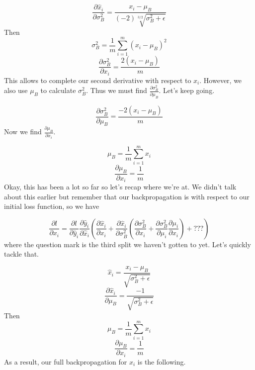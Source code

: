 \documentclass[12pt]{article}
\begin{document}
\begin{equation*}
    \frac{\partial \hat{x}_i}{\partial \sigma_B^2} = 
    \frac{x_i - \mu_B}{(-2) \sqrt[3/2]{\sigma_B^2 + \epsilon}}
\end{equation*}
Then 
\begin{equation*}
    \sigma_B^2 = \frac{1}{m} \sum_{i=1}^m (x_i - \mu_B)^2
\end{equation*}
\begin{equation*}
    \frac{\partial \sigma_B^2}{\partial x_i} = 
    \frac{2(x_i - \mu_B)}{m}
\end{equation*}
This allows to complete our second derivative with respect to $x_i$. However, we also use 
$\mu_B$ to calculate $\sigma_B^2$. Thus we must find 
$\frac{\partial \sigma_B^2}{\partial \mu_B}$. Let's keep going. 

\begin{equation*}
    \frac{\partial \sigma_B^2}{\partial \mu_B} = 
    \frac{-2(x_i - \mu_B)}{m}
\end{equation*}
Now we find $\frac{\partial \mu_B}{\partial x_i}$. 

\begin{equation*}
    \mu_B = \frac{1}{m} \sum_{i=1}^m x_i
\end{equation*}
\begin{equation*}
    \frac{\partial \mu_B}{\partial x_i} = 
    \frac{1}{m}
\end{equation*}
Okay, this has been a lot so far so let's recap where we're at. We didn't talk 
about this earlier but remember that our backpropagation is with respect to 
our initial loss function, so we have

\begin{equation*}
    \frac{\partial l}{\partial x_i} = 
    \frac{\partial l}{\partial \hat{y}_i} 
    \frac{\partial \hat{y}_i} {\partial \hat{x}_i} 
    (
        \frac{\partial \hat{x}_i}{\partial x_i} + 
        \frac{\partial \hat{x}_i}{\partial \sigma_B^2} 
        (
            \frac{\partial \sigma_B^2}{\partial x_i} + 
            \frac{\partial \sigma_B^2}{\partial \mu_i} 
            \frac{\partial \mu_i}{\partial x_i} 
        ) + 
        ???
    )
\end{equation*}
where the question mark is the third split we haven't gotten to yet. Let's quickly tackle that. 

\begin{equation*}
    \hat{x}_i = \frac{x_i - \mu_B}{\sqrt{\sigma_B^2 + \epsilon}}
\end{equation*}
\begin{equation*}
    \frac{\partial \hat{x}_i}{\partial \mu_B} = \frac{-1}{\sqrt{\sigma_B^2 + \epsilon}}
\end{equation*}
Then 
\begin{equation*}
    \mu_B = \frac{1}{m} \sum_{i=1}^m x_i
\end{equation*}
\begin{equation*}
    \frac{\partial \mu_B}{\partial x_i} = \frac{1}{m}
\end{equation*}
As a result, our full backpropagation for $x_i$ is the following. 
\end{document}

